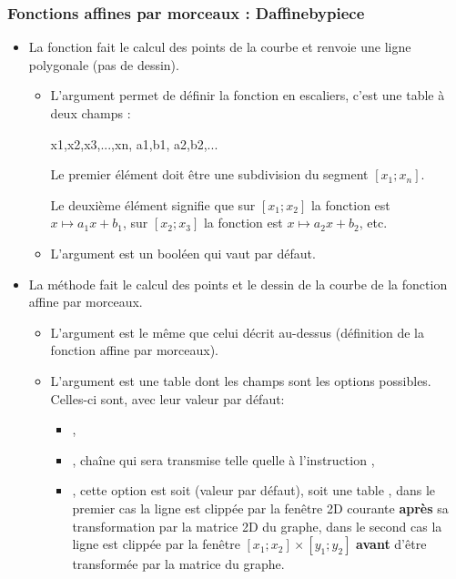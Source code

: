 \subsubsection{Fonctions affines par morceaux : Daffinebypiece}

\begin{itemize}
\item La fonction  fait le calcul des points de la courbe et renvoie une ligne polygonale (pas de dessin).

  \begin{itemize}
  \item  L'argument  permet de définir la fonction en escaliers, c'est une table à deux champs :

\begin{TeXcode}
 { {x1,x2,x3,...,xn}, { {a1,b1}, {a2,b2},...} }
\end{TeXcode}

  Le premier élément  doit être une subdivision du segment \([x_1;x_n]\).
  
  Le deuxième élément  signifie que sur $[x_1;x_2]$ la fonction est \(x\mapsto a_1x+b_1\), sur $[x_2;x_3]$ la fonction est \(x\mapsto a_2x+b_2\), etc.
  
  \item L'argument  est un booléen qui vaut \true par défaut.
  \end{itemize}
  
\item La méthode  fait le calcul des points et le dessin de la courbe de la fonction affine par morceaux.

  \begin{itemize}
  \item L'argument  est le même que celui décrit au-dessus (définition de la fonction affine par morceaux).
  \item L'argument  est une table dont les champs sont les options possibles. Celles-ci sont, avec leur valeur par défaut:
  \begin{itemize}
      \item {},
      \item {},  chaîne qui sera transmise telle quelle à l'instruction \drawcmd,
      \item {}, cette option est soit \nil (valeur par défaut), soit une table , dans le premier cas la ligne est clippée par la fenêtre 2D courante \textbf{après} sa transformation par la matrice 2D du graphe, dans le second cas la ligne est clippée par la fenêtre $[x_1;x_2]\times[y_1;y_2]$ \textbf{avant} d'être transformée par la matrice du graphe.
  \end{itemize}
\end{itemize}
\end{itemize}

